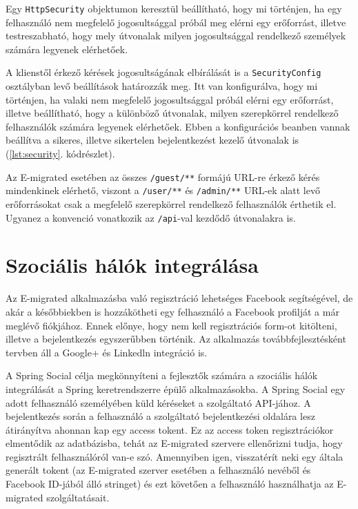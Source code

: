 \begin{listing}[!b]
  \inputminted[fontsize=\small]{java}{progfiles/security.java}
  \caption{Egy \texttt{HttpSecurity} objektumon keresztül beállítható, hogy mi történjen, ha egy felhasználó nem megfelelő jogosultsággal próbál meg elérni egy erőforrást, illetve testreszabható, hogy mely útvonalak milyen jogosultsággal rendelkező személyek számára legyenek elérhetőek.}
  \label{lst:security}
\end{listing}

A klienstől érkező kérések jogosultságának elbírálását is a \texttt{SecurityConfig} osztályban levő beállítások határozzák meg. Itt van konfigurálva, hogy mi történjen, ha valaki nem megfelelő jogosultsággal próbál elérni egy erőforrást, illetve beállítható, hogy a különböző útvonalak, milyen szerepkörrel rendelkező felhasználók számára legyenek elérhetőek. Ebben a konfigurációs beanben vannak beállítva a sikeres, illetve sikertelen bejelentkezést kezelő útvonalak is (\ref{lst:security}. kódrészlet). 


Az E-migrated esetében az összes \texttt{/guest/**} formájú URL-re érkező kérés mindenkinek elérhető, viszont a \texttt{/user/**} és \texttt{/admin/**} URL-ek alatt levő erőforrásokat csak a megfelelő szerepkörrel rendelkező felhasználók érthetik el. Ugyanez a konvenció vonatkozik az \texttt{/api}-val kezdődő útvonalakra is.

\section{Szociális hálók integrálása}
\label{subsec:szocialisHalo}

Az E-migrated alkalmazásba való regisztráció lehetséges Facebook segítségével, de akár a későbbiekben is hozzákötheti egy felhasználó a Facebook profilját a már meglévő fiókjához. Ennek előnye, hogy nem kell regisztrációs form-ot kitölteni, illetve a bejelentkezés egyszerűbben történik. Az alkalmazás továbbfejlesztésként tervben áll a Google+ és Linkedln integráció is. 


A Spring Social \cite{SpringSocial} célja megkönnyíteni a fejlesztők számára a szociális hálók integrálását a Spring keretrendszerre épülő alkalmazásokba. A Spring Social egy adott felhasználó személyében küld kéréseket a szolgáltató API-jához. A bejelentkezés során a felhasználó a szolgáltató bejelentkezési oldalára lesz átirányítva ahonnan kap egy access tokent. Ez az access token regisztrációkor elmentődik az adatbázisba, tehát az E-migrated szervere ellenőrizni tudja, hogy regisztrált felhasználóról van-e szó. Amennyiben igen, visszatérít neki egy általa generált tokent (az E-migrated szerver esetében a felhasználó nevéből és Facebook ID-jából álló stringet) és ezt követően a felhasználó használhatja az E-migrated szolgáltatásait. 

